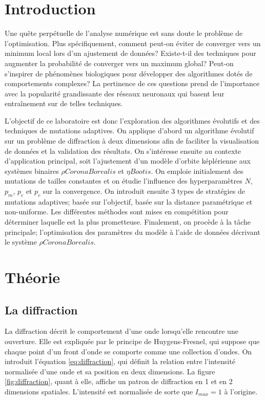 \documentclass{article}
\begin{document}
\section{Introduction}\label{sec:introduction}

Une quête perpétuelle de l'analyse numérique est sans doute le problème de l'optimisation. Plus spécifiquement, comment peut-on éviter de converger vers un minimum local lors d'un ajustement de données? Existe-t-il des techniques pour augmenter la probabilité de converger vers un maximum global? Peut-on s'inspirer de phénomènes biologiques pour développer des algorithmes dotés de comportements complexes? La pertinence de ces questions prend de l'importance avec la popularité grandissante des réseaux neuronaux qui basent leur entraînement sur de telles techniques.

L'objectif de ce laboratoire est donc l'exploration des algorithmes évolutifs et des techniques de mutations adaptives. On applique d'abord un algorithme évolutif sur un problème de diffraction à deux dimensions afin de faciliter la visualisation de données et la validation des résultats. On s'intéresse ensuite au contexte d'application principal, soit l'ajustement d'un modèle d'orbite képlérienne aux systèmes binaires $\rho Corona Borealis$ et $\eta Bootis$. On emploie initialement des mutations de tailles constantes et on étudie l'influence des hyperparamètres  $N$, $p_m$, $p_c$ et $p_c$ sur la convergence. On introduit ensuite $3$ types de stratégies de mutations adaptives; basée sur l'objectif, basée sur la distance paramétrique et non-uniforme. Les différentes méthodes sont mises en compétition pour déterminer laquelle est la plus prometteuse. Finalement, on procède à la tâche principale; l'optimisation des paramètres du modèle à l'aide de données décrivant le système $\rho Corona Borealis$.

\section{Théorie}\label{sec:theorie}

\subsection{La diffraction}

La diffraction décrit le comportement d'une onde lorsqu'elle rencontre une ouverture. Elle est expliquée par le principe de Huygens-Fresnel, qui suppose que chaque point d'un front d'onde se comporte comme une collection d'ondes. On introduit l'équation \ref{eq:diffraction}, qui définit la relation entre l'intensité normalisée d'une onde et sa position en deux dimensions. La figure \ref{fig:diffraction}, quant à elle, affiche un patron de diffraction en 1 et en 2 dimensions spatiales. L'intensité est normalisée de sorte que $I_{max}=1$ à l'origine.
\end{document}
